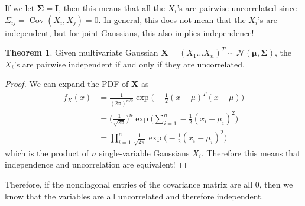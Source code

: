 \documentclass{article}
\DeclareMathOperator{\Cov}{Cov}
\theoremstyle{definition}
\newtheorem{theorem}{Theorem}[section]
\theoremstyle{remark}
\theoremstyle{definition}
\begin{document}
If we let $\boldsymbol{\Sigma} = \mathbf{I}$, then this means that all the $X_i$'s are pairwise uncorrelated since $\Sigma_{ij} = \Cov (X_i, X_j) = 0$. In general, this does not mean that the $X_i$'s are independent, but for joint Gaussians, this also implies independence! 

\begin{theorem}
Given multivariate Gaussian $\mathbf{X} = (X_1 \ldots X_n)^T \sim \mathcal{N}(\boldsymbol{\mu}, \boldsymbol{\Sigma})$, the $X_i$'s are pairwise independent if and only if they are uncorrelated. 
\end{theorem}
\begin{proof}
We can expand the PDF of $\mathbf{X}$ as 
\begin{align*}
    f_X (x) & = \frac{1}{(2 \pi)^{n/2}} \exp \bigg( -\frac{1}{2} (x - \mu)^T (x - \mu) \bigg) \\
    & = \bigg(\frac{1}{\sqrt{2\pi}} \bigg)^n \exp \bigg( \sum_{i=1}^n -\frac{1}{2} (x_i - \mu_i)^2 \bigg) \\
    & = \prod_{i=1}^n \frac{1}{\sqrt{2\pi}} \exp \bigg( -\frac{1}{2} (x_i - \mu_i)^2 \bigg)
\end{align*}
which is the product of $n$ single-variable Gaussians $X_i$. Therefore this means that independence and uncorrelation are equivalent! 
\end{proof}

Therefore, if the nondiagonal entries of the covariance matrix are all $0$, then we know that the variables are all uncorrelated and therefore independent. 
\end{document}
